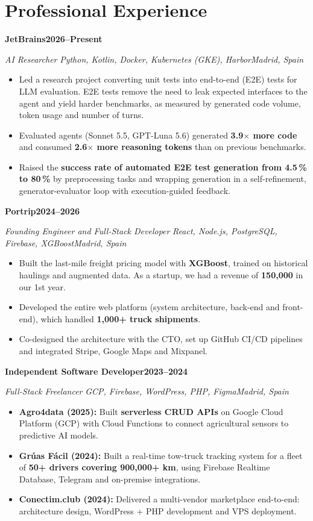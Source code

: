 \documentclass[10pt,letterpaper]{article}
\newenvironment{cvblock}{%
  \begin{list}{}{%
    \setlength{\leftmargin}{10.8pt}%
    \setlength{\rightmargin}{5.4pt}%
    \setlength{\topsep}{0pt}%
    \setlength{\partopsep}{0pt}%
    \setlength{\parsep}{0pt}%
    \setlength{\itemsep}{0pt}%
  }\item[]%
}{\end{list}}
\newcommand{\cvrole}[5]{%
  {\fontsize{11}{13}\selectfont\textbf{#1}\hfill\textbf{#2}\par}%
  \textit{#3}\,\textbar\,\textit{#4}\hfill\textit{#5}\par
}
\newenvironment{cvbullets}{%
  \begin{itemize}[leftmargin=24pt,label=\textbullet,
    labelsep=5pt,itemsep=1pt,topsep=1pt,parsep=0pt,partopsep=0pt]%
}{\end{itemize}}
\newcommand{\cvspace}{\vspace{2pt}}
\begin{document}
\section{Professional Experience}
\begin{cvblock}
  \cvrole{JetBrains}{2026--Present}{AI Researcher}
    {Python, Kotlin, Docker, Kubernetes (GKE), Harbor}{Madrid, Spain}
  \begin{cvbullets}
    \item Led a research project converting unit tests into end-to-end (E2E) tests for LLM evaluation. E2E tests remove the need to leak expected interfaces to the agent and yield harder benchmarks, as measured by generated code volume, token usage and number of turns.
    \item Evaluated agents (Sonnet 5.5, GPT-Luna 5.6) generated \textbf{3.9$\times$ more code} and consumed \textbf{2.6$\times$ more reasoning tokens} than on previous benchmarks.
    \item Raised the \textbf{success rate of automated E2E test generation from 4.5\,\% to 80\,\%} by preprocessing tasks and wrapping generation in a self-refinement, generator-evaluator loop with execution-guided feedback.
  \end{cvbullets}
  \cvspace
  \cvrole{Portrip}{2024--2026}{Founding Engineer and Full-Stack Developer}
    {React, Node.js, PostgreSQL, Firebase, XGBoost}{Madrid, Spain}
  \begin{cvbullets}
    \item Built the last-mile freight pricing model with \textbf{XGBoost}, trained on historical haulings and augmented data. As a startup, we had a revenue of \textbf{\texteuro{}150,000} in our 1st year.
    \item Developed the entire web platform (system architecture, back-end and front-end), which handled \textbf{1,000+ truck shipments}.
    \item Co-designed the architecture with the CTO, set up GitHub CI/CD pipelines and integrated Stripe, Google Maps and Mixpanel.
  \end{cvbullets}
  \cvspace
  \cvrole{Independent Software Developer}{2023--2024}{Full-Stack Freelancer}
    {GCP, Firebase, WordPress, PHP, Figma}{Madrid, Spain}
  \begin{cvbullets}
    \item \textbf{Agro4data (2025):} Built \textbf{serverless CRUD APIs} on Google Cloud Platform (GCP) with Cloud Functions to connect agricultural sensors to predictive AI models.
    \item \textbf{Grúas Fácil (2024):} Built a real-time tow-truck tracking system for a fleet of \textbf{50+ drivers covering 900,000+ km}, using Firebase Realtime Database, Telegram and on-premise integrations.
    \item \textbf{Conectim.club (2024):} Delivered a multi-vendor marketplace end-to-end: architecture design, WordPress + PHP development and VPS deployment.
  \end{cvbullets}
\end{cvblock}
\end{document}

